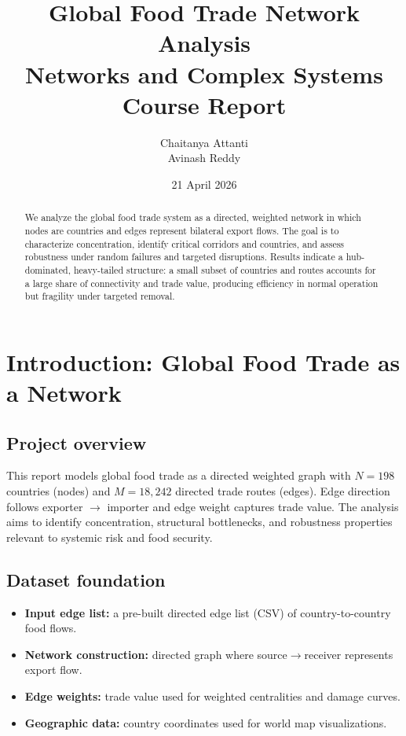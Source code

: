\documentclass[11pt]{article}
\title{Global Food Trade Network Analysis\\\large Networks and Complex Systems Course Report}
\author{Chaitanya Attanti \\ Avinash Reddy}
\date{21 April 2026}
\begin{document}
\maketitle

\begin{abstract}
We analyze the global food trade system as a directed, weighted network in which nodes are countries and edges represent bilateral export flows. The goal is to characterize concentration, identify critical corridors and countries, and assess robustness under random failures and targeted disruptions. Results indicate a hub-dominated, heavy-tailed structure: a small subset of countries and routes accounts for a large share of connectivity and trade value, producing efficiency in normal operation but fragility under targeted removal.
\end{abstract}

\section{Introduction: Global Food Trade as a Network}
\subsection{Project overview}
This report models global food trade as a directed weighted graph with $N=198$ countries (nodes) and $M=18{,}242$ directed trade routes (edges). Edge direction follows exporter $\rightarrow$ importer and edge weight captures trade value. The analysis aims to identify concentration, structural bottlenecks, and robustness properties relevant to systemic risk and food security.

\subsection{Dataset foundation}
\begin{itemize}
  \item \textbf{Input edge list:} a pre-built directed edge list (CSV) of country-to-country food flows.
  \item \textbf{Network construction:} directed graph where source$\rightarrow$receiver represents export flow.
  \item \textbf{Edge weights:} trade value used for weighted centralities and damage curves.
  \item \textbf{Geographic data:} country coordinates used for world map visualizations.
\end{itemize}
\end{document}
